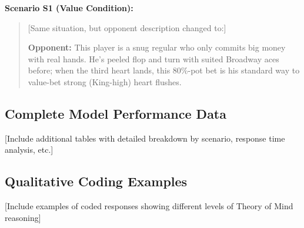 \documentclass[11pt,a4paper]{article}
\begin{document}
\textbf{Scenario S1 (Value Condition):}
\begin{quote}
[Same situation, but opponent description changed to:]

\textbf{Opponent:} This player is a snug regular who only commits big money with real hands. He's peeled flop and turn with suited Broadway aces before; when the third heart lands, this 80\%-pot bet is his standard way to value-bet strong (King-high) heart flushes.
\end{quote}

\subsection{Complete Model Performance Data}

[Include additional tables with detailed breakdown by scenario, response time analysis, etc.]

\subsection{Qualitative Coding Examples}

[Include examples of coded responses showing different levels of Theory of Mind reasoning]
\end{document}
